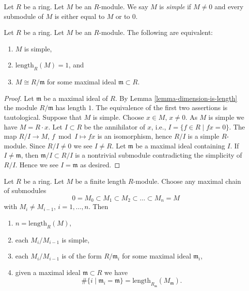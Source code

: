 \begin{definition}
\label{definition-simple-module}
Let $R$ be a ring. Let $M$ be an $R$-module.
We say $M$ is {\it simple} if $M \not = 0$ and
every submodule of $M$ is either equal to $M$ or
to $0$.
\end{definition}

\begin{lemma}
\label{lemma-characterize-length-1}
Let $R$ be a ring. Let $M$ be an $R$-module.
The following are equivalent:
\begin{enumerate}
\item $M$ is simple,
\item $\text{length}_R(M) = 1$, and
\item $M \cong R/\mathfrak m$ for some maximal ideal
$\mathfrak m \subset R$.
\end{enumerate}
\end{lemma}

\begin{proof}
Let $\mathfrak m$ be a maximal ideal of $R$.
By Lemma \ref{lemma-dimension-is-length} the module
$R/\mathfrak m$ has length $1$. The equivalence of
the first two assertions is tautological.
Suppose that $M$ is simple. Choose $x \in M$, $x \not = 0$.
As $M$ is simple we have $M = R \cdot x$.
Let $I \subset R$ be the annihilator of $x$, i.e.,
$I = \{f \in R \mid fx = 0\}$. The map $R/I \to M$,
$f \bmod I \mapsto fx$ is an isomorphism, hence
$R/I$ is a simple $R$-module. Since $R/I \not = 0$ we see $I \not = R$.
Let $\mathfrak m$ be a maximal ideal containing $I$.
If $I \not = \mathfrak m$, then $\mathfrak m /I \subset R/I$
is a nontrivial submodule contradicting the simplicity
of $R/I$. Hence we see $I = \mathfrak m$ as desired.
\end{proof}

\begin{lemma}
\label{lemma-simple-pieces}
Let $R$ be a ring. Let $M$ be a finite length $R$-module.
Choose any maximal chain of submodules
$$
0 = M_0 \subset M_1 \subset M_2 \subset \ldots \subset M_n = M
$$
with $M_i \not = M_{i-1}$, $i = 1, \ldots, n$. Then
\begin{enumerate}
\item $n = \text{length}_R(M)$,
\item each $M_i/M_{i-1}$ is simple,
\item each $M_i/M_{i-1}$ is of the form
$R/\mathfrak m_i$ for some maximal ideal $\mathfrak m_i$,
\item given a maximal ideal $\mathfrak m \subset R$
we have
$$
\# \{i \mid \mathfrak m_i = \mathfrak m\}
=
\text{length}_{R_{\mathfrak m}} (M_{\mathfrak m}).
$$
\end{enumerate}
\end{lemma}

